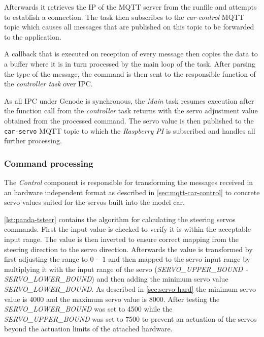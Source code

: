 Afterwards it retrieves the IP of the MQTT server from the runfile and attempts to establish a connection.
The task then subscribes to the \textit{car-control} MQTT topic which causes all messages that are published on this topic to be forwarded to the application.

A callback that is executed on reception of every message then copies the data to a buffer where it is in turn processed by the main loop of the task.
After parsing the type of the message, the command is then sent to the responsible function of the \textit{controller task} over IPC.

As all IPC under Genode is synchronous, the \textit{Main} task resumes execution after the function call from the \textit{controller} task returns with the servo adjustment value obtained from the processed command.
The servo value is then published to the \texttt{car-servo} MQTT topic to which the \textit{Raspberry PI} is subscribed and handles all further processing.


\subsubsection{Command processing}
\label{sec:panda-convert}
The \textit{Control} component is responsible for transforming the messages received in an hardware independent format as described in \autoref{sec:mqtt-car-control} to concrete servo values suited for the servos built into the model car.

\autoref{lst:panda-tsteer} contains the algorithm for calculating the steering servos commands.
First the input value is checked to verify it is within the acceptable input range.
The value is then inverted to ensure correct mapping from the steering direction to the servo direction.
Afterwards the value is transformed by first adjusting the range to $0-1$ and then mapped to the servo input range by multiplying it with the input range of the servo (\textit{SERVO\_UPPER\_BOUND - SERVO\_LOWER\_BOUND}) and then adding the minimum servo value \textit{SERVO\_LOWER\_BOUND}.
As described in \autoref{sec:servo-hard} the minimum servo value is 4000 and the maximum servo value is 8000.
After testing the \textit{SERVO\_LOWER\_BOUND} was set to 4500 while the \textit{SERVO\_UPPER\_BOUND} was set to 7500 to prevent an actuation of the servos beyond the actuation limits of the attached hardware. \\

